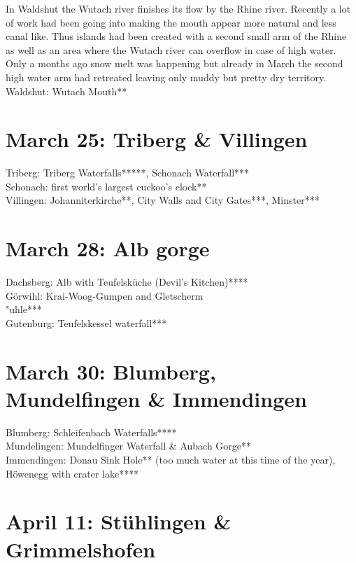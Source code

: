In Waldshut the Wutach river finishes its flow by the Rhine river. Recently a lot of work had been going into making the mouth appear more natural and less canal like. Thus islands had been created with a second small arm of the Rhine as well as an area where the Wutach river can overflow in case of high water. Only a months ago snow melt was happening but already in March the second high water arm had retreated leaving only muddy but pretty dry territory.\\

Waldshut: Wutach Mouth**\\

\section{March 25: Triberg \& Villingen}
\label{2021:Triberg}

Triberg: Triberg Waterfalls*****, Schonach Waterfall***\\
Schonach: first world's largest cuckoo's clock**\\
Villingen: Johanniterkirche**, City Walls and City Gates***, Minster***

\section{March 28: Alb gorge}
\label{2021:Albtal}

Dachsberg: Alb with Teufelsk\"uche (Devil's Kitchen)****\\
G\"orwihl: Krai-Woog-Gumpen and Gletscherm\\"uhle***\\
Gutenburg: Teufelskessel waterfall***

\section{March 30: Blumberg, Mundelfingen \& Immendingen}
\label{2021:Blumberg}

Blumberg: Schleifenbach Waterfalls****\\
Mundelingen: Mundelfinger Waterfall \& Aubach Gorge**\\
Immendingen: Donau Sink Hole** (too much water at this time of the year), H\"owenegg with crater lake****\\

\section{April 11: St\"uhlingen \& Grimmelshofen}
\label{2021Stuehlingen}

